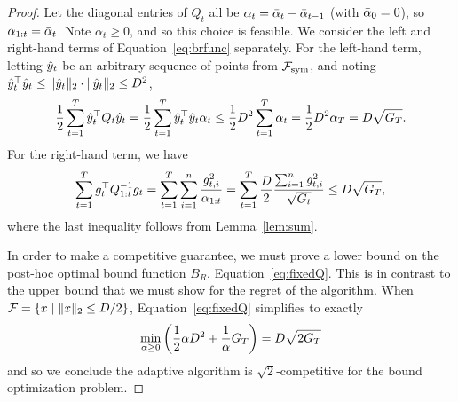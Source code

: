\begin{proof}
Let the diagonal entries of $Q_t$ all be $\alpha_t = \bar{\alpha}_{t} -
\bar{\alpha}_{t-1}$ (with $\bar{\alpha}_0 = 0$), so $\alpha_{1:t} = \bar{\alpha}_{t}$.
Note $\alpha_t \geq 0$, and so this choice is feasible.
We consider the left and right-hand terms of
Equation~\eqref{eq:brfunc} separately.  For the left-hand term,
letting $\hat{y}_t$ be an arbitrary sequence of points from $\mathcal{F}_{\text{sym}}$, and
noting $\hat{y}_t^\top \hat{y}_t \leq
\| \hat{y}_t \|_2 \cdot \| \hat{y}_t \|_2 \leq D^2$,
\[ 
   \frac{1}{2} \sum_{t=1}^T \hat{y}_t^\top Q_t\hat{y}_t 
  = \frac{1}{2}\sum_{t=1}^T  \hat{y}_t^\top \hat{y}_t \alpha_t
  \leq \frac{1}{2}D^2 \sum_{t=1}^T\alpha_t
  =  \frac{1}{2}D^2 \bar{\alpha}_T
  = D\sqrt{G_T}.
\] 
For the right-hand term, we have 
\[
 \sum_{t=1}^T g_t^\top Q_{1:t}^{-1}g_t
  = \sum_{t=1}^T \sum_{i=1}^n \frac{g_{t,i}^2}{\alpha_{1:t}}
  = \sum_{t=1}^T \frac{D}{2} \frac{\sum_{i=1}^n g_{t,i}^2}{\sqrt{G_t}}
 \leq D \sqrt{G_T},
\]
where the last inequality follows from Lemma~\ref{lem:sum}.  

In order to make a competitive guarantee, we must prove a lower bound
on the post-hoc optimal bound function $B_R$,
Equation~\eqref{eq:fixedQ}.  This is in contrast to the upper bound
that we must show for the regret of the algorithm.  When $\mathcal{F} =
\left\{x \mid \| x \|_2 \leq D/2\right\}$, Equation~\eqref{eq:fixedQ} simplifies to exactly
\begin{equation}\label{eq:fixed_posthoc}
\min_{\alpha \geq 0} \left( \frac{1}{2} \alpha D^2
             + \frac{1}{\alpha} G_T \right) = D\sqrt{2G_T}
\end{equation}
and so we conclude the adaptive algorithm is $\sqrt{2}$-competitive
for the bound optimization problem.
\end{proof}
